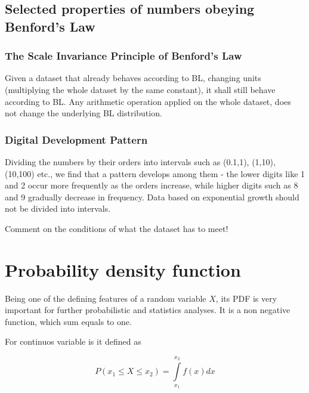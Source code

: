 \subsection{Selected properties of numbers obeying Benford's Law}

\subsubsection{The Scale Invariance Principle of Benford's Law}

Given a dataset that already behaves according to BL, changing units (multiplying the whole dataset by the same constant), it shall still behave according to BL. Any arithmetic operation applied on the whole dataset, does not change the underlying BL distribution. \cite{kossovsky2014benford, Hronova2023} %

\subsubsection{Digital Development Pattern}

Dividing the numbers by their orders into intervals such as (0.1,1), (1,10), (10,100) etc., we find that a pattern develops among them - the lower digits like 1 and 2 occur more frequently as the orders increase, while higher digits such as 8 and 9 gradually decrease in frequency. Data based on exponential growth should not be divided into intervals. \cite{kossovsky2014benford} %


\begin{koment}
Comment on the conditions of what the dataset has to meet! 
\end{koment}

\section{Probability density function}

Being one of the defining features of a random variable $X$, its PDF is very important for further probabilistic and statistics analyses. It is a non negative function, which sum equals to one. 

For continuos variable is it defined as 

\begin{equation}
    P(x_1 \le X \le x_2) = \int\limits_{x_1}^{x_2} f (x) dx
\end{equation}

